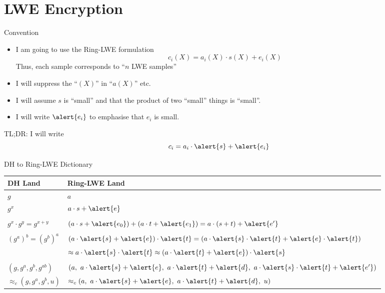 \documentclass[xcolor=table,10pt,aspectratio=169]{beamer}
\begin{document}
\section{LWE Encryption}
\label{sec:orgf9ed2d8}
\begin{frame}[label={sec:org25fa90a}]{Convention}
\begin{itemize}
\item I am going to use the Ring-LWE formulation \[c_{i}(X) = a_{i}(X)\cdot s(X) + e_{i}(X)\]
Thus, each sample corresponds to ``\(n\) LWE samples''
\item I will suppress the ``\((X)\)'' in ``\(a(X)\)'' etc.
\item I will assume \(s\) is ``small'' and that the product of two ``small'' things is ``small''.
\item I will write \(\alert{e_{i}}\) to emphasise that \(e_{i}\) is small.
\end{itemize}
\begin{block}{TL;DR: I will write}
\[c_{i} = a_{i}\cdot \alert{s} + \alert{e_{i}}\]
\end{block}
\end{frame}
\begin{frame}[label={sec:org245ab3f}]{DH to Ring-LWE Dictionary}
\begin{center}
\begin{tabular}{ll}
\toprule
DH Land & Ring-LWE Land\\
\midrule
\(g\) & \(a\)\\
\(g^x\) & \(a\cdot {s} + \alert{e}\)\\
 & \\
\(g^x \cdot g^y = g^{x+y}\) & \((a\cdot {s} + \alert{e_0}) + (a \cdot {t} + \alert{e_1}) = a \cdot {(s+t)} + \alert{e'}\)\\
 & \\
\((g^a)^b = (g^b)^a\) & \((a\cdot \alert{s} + \alert{e})\cdot \alert{t} = (a\cdot \alert{s} \cdot \alert{t} + \alert{e} \cdot \alert{t})\)\\
 & \(\approx a\cdot \alert{s} \cdot \alert{t} \approx (a\cdot \alert{t} + \alert{e})\cdot \alert{s}\)\\
 & \\
\((g, g^a, g^b, g^{ab})\) & \((a,\ a\cdot \alert{s} + \alert{e},\ a\cdot \alert{t} + \alert{d},\ a \cdot \alert{s} \cdot \alert{t} + \alert{e'})\)\\
\(\approx_c (g, g^a, g^b, u)\) & \(\approx_c (a,\ a\cdot \alert{s} + \alert{e},\ a\cdot \alert{t} + \alert{d},\ u)\)\\
\bottomrule
\end{tabular}

\end{center}
\end{frame}
\end{document}
